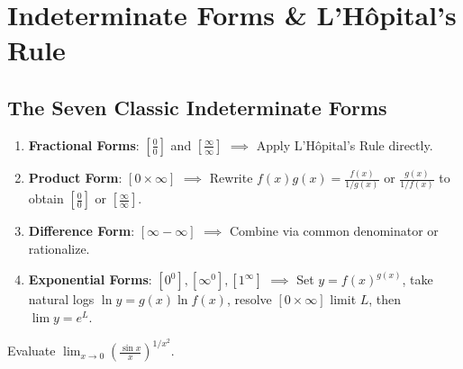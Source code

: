 \section{Indeterminate Forms \& L'H\^opital's Rule}

\subsection{The Seven Classic Indeterminate Forms}
\begin{enumerate}[leftmargin=1.5em]
    \item \textbf{Fractional Forms}: $\left[\frac{0}{0}\right]$ and $\left[\frac{\infty}{\infty}\right]$ $\implies$ Apply L'H\^opital's Rule directly.
    \item \textbf{Product Form}: ${[0 \times \infty]}$ $\implies$ Rewrite $f(x)g(x) = \frac{f(x)}{1/g(x)}$ or $\frac{g(x)}{1/f(x)}$ to obtain $\left[\frac{0}{0}\right]$ or $\left[\frac{\infty}{\infty}\right]$.
    \item \textbf{Difference Form}: ${[\infty - \infty]}$ $\implies$ Combine via common denominator or rationalize.
    \item \textbf{Exponential Forms}: $[0^0], [\infty^0], [1^\infty]$ $\implies$ Set $y = f(x)^{g(x)}$, take natural logs $\ln y = g(x)\ln f(x)$, resolve ${[0 \times \infty]}$ limit $L$, then $\lim y = e^L$.
\end{enumerate}

\begin{example}
Evaluate $\lim_{x\to 0} \left(\frac{\sin x}{x}\right)^{1/x^2}$.
\end{example}

